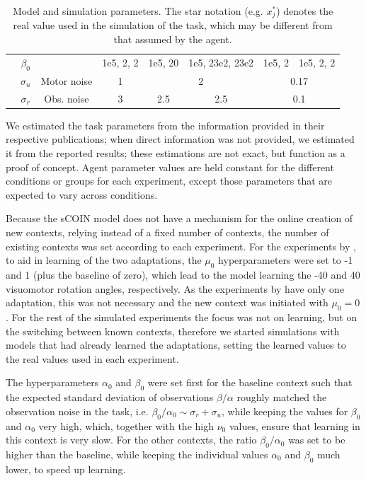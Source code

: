 \documentclass[a4paper,doc,floatsintext,natbib]{apa6}
\begin{document}
\begin{table}[h!]
{\begin{tabular}{|c|c|c|c|c|c|c|c|c|c|c|}
  \cline{2-2} \cline{4-11}
  & $\beta_0$ & & 1e5, 2, 2 & \multicolumn{2}{c|}{1e5, 20} & \multicolumn{2}{c|}{1e5, 23e2, 23e2} & \multicolumn{2}{c|}{1e5, 2} & 1e5, 2, 2 \\
  \cline{2-11}
  & $\sigma_u$ & Motor noise & 1 & \multicolumn{4}{c|}{2} & \multicolumn{3}{c|}{0.17} \\
  \cline{2-11}
  & $\sigma_r$& Obs. noise & 3 & \multicolumn{2}{c|}{2.5} & \multicolumn{2}{c|}{2.5} & \multicolumn{3}{c|}{0.1} \\
  \cline{1-11}
  \end{tabular}}
\caption{Model and simulation parameters. The star notation (e.g. $x_j^*$) denotes the real value used in the simulation of the task, which may be different from that assumed by the agent.}
\label{tab:parameters}
\end{table}

We estimated the task parameters from the information provided in their respective publications; when direct information was not provided, we estimated it from the reported results; these estimations are not exact, but function as a proof of concept. Agent parameter values are held constant for the different conditions or groups for each experiment, except those parameters that are expected to vary across conditions. 

Because the sCOIN model does not have a mechanism for the online creation of new contexts, relying instead of a fixed number of contexts, the number of existing contexts was set according to each experiment. For the experiments by \cite{Kim_Neural_2015}, to aid in learning of the two adaptations, the $\mu_0$ hyperparameters were set to -1 and 1 (plus the baseline of zero), which lead to the model learning the -40 and 40 visuomotor rotation angles, respectively. As the experiments by \cite{Oh_Minimizing_2019} have only one adaptation, this was not necessary and the new context was initiated with $\mu_0 = 0$. For the rest of the simulated experiments the focus was not on learning, but on the switching between known contexts, therefore we started simulations with models that had already learned the adaptations, setting the learned values to the real values used in each experiment.

The hyperparameters $\alpha_0$ and $\beta_0$ were set first for the baseline context such that the expected standard deviation of observations $\beta / \alpha$ roughly matched the observation noise in the task, i.e. $\beta_0 / \alpha_0 \sim \sigma_r + \sigma_u$, while keeping the values for $\beta_0$ and $\alpha_0$ very high, which, together with the high $\nu_0$ values, ensure that learning in this context is very slow. For the other contexts, the ratio $\beta_0 /  \alpha_0$ was set to be higher than the baseline, while keeping the individual values $\alpha_0$ and $\beta_0$ much lower, to speed up learning.
\end{document}
